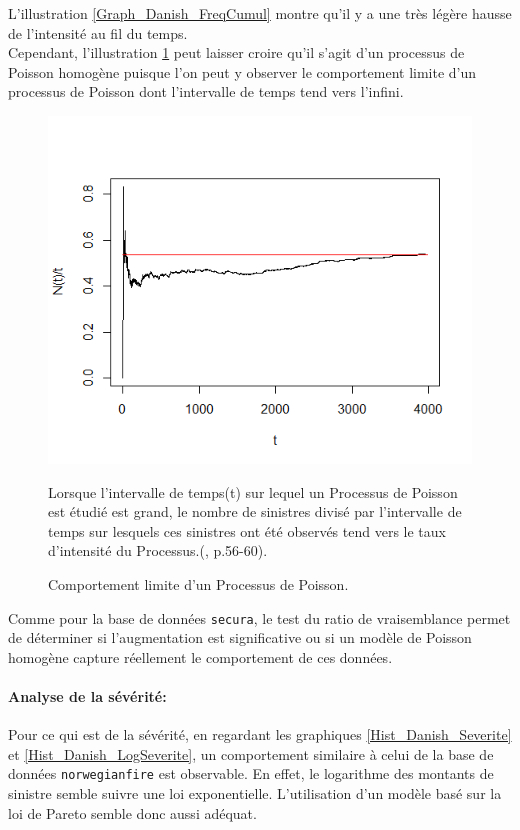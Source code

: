 		L'illustration \ref{Graph_Danish_FreqCumul} montre qu'il y a une très légère hausse de l'intensité au fil du temps.\\
		
		Cependant, l'illustration \ref{Graph_CompLimit_PoissHomo} peut laisser croire qu'il s'agit d'un processus de Poisson homogène puisque l'on peut y observer le comportement limite d'un processus de Poisson dont l'intervalle de temps tend vers l'infini.
		
		\begin{figure}[H]
			\begin{center}
			\includegraphics[scale=0.5]{Graphiques/Graph_CompLimit_PoissHomo} 
			\end{center}
			\renewcommand{\figurename}{Illustration}
			\caption{Comportement limite d'un Processus de Poisson.} Lorsque l'intervalle de temps(t) sur lequel un Processus de Poisson est étudié est grand, le nombre de sinistres divisé par l'intervalle de temps sur lesquels ces sinistres ont été observés tend vers le taux d'intensité du Processus.(\cite{Mikosch_PoissProcess2009}, p.56-60).\label{Graph_CompLimit_PoissHomo} 
		\end{figure}
	
		Comme pour la base de données \texttt{secura}, le test du ratio de vraisemblance permet de déterminer si l'augmentation est significative ou si un modèle de Poisson homogène capture réellement le comportement de ces données.
		
		\paragraph{Analyse de la sévérité:}
		Pour ce qui est de la sévérité, en regardant les graphiques \ref{Hist_Danish_Severite} et \ref{Hist_Danish_LogSeverite}, un comportement similaire à celui de la base de données \texttt{norwegianfire} est observable. En effet, le logarithme des montants de sinistre semble suivre une loi exponentielle. L'utilisation d'un modèle basé sur la loi de Pareto semble donc aussi adéquat.
		
